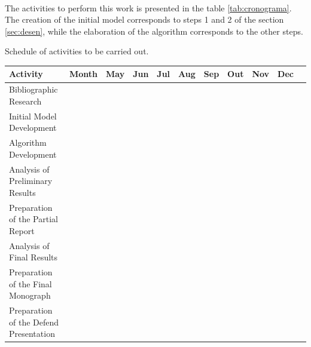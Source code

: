 \documentclass[11pt, a4paper]{article}
\begin{document}
    \paragraph{}
    The activities to perform this work is presented in the table \ref{tab:cronograma}. The creation of the initial model corresponds to steps 1 and 2 of the section \ref{sec:desen}, while the elaboration of the algorithm corresponds to the other steps.
    
    \begin{adjustwidth}{-2.5 cm}{-2.5 cm}\centering
    \begin{threeparttable}[!htb]
        \caption{Schedule of activities to be carried out.}\label{tab:cronograma}
        \scriptsize
        \begin{tabular}{|lr|r|r|r|r|r|r|r|r|r|}\hline%
            \textbf{Activity} &\textbf{Month} &May &Jun &Jul &Aug &Sep &Out &Nov &Dec \\\hline%
            Bibliographic Research & &\cellcolor[HTML]{6aa84f} &\cellcolor[HTML]{6aa84f} &\cellcolor[HTML]{6aa84f} &\cellcolor[HTML]{6aa84f} &\cellcolor[HTML]{6aa84f} &\cellcolor[HTML]{6aa84f} &\cellcolor[HTML]{6aa84f} & \\ \hline
            Initial Model Development & &\cellcolor[HTML]{6aa84f} &\cellcolor[HTML]{6aa84f} & & & & & & \\ \hline
            Algorithm Development & & &\cellcolor[HTML]{6aa84f} &\cellcolor[HTML]{6aa84f} &\cellcolor[HTML]{6aa84f} &\cellcolor[HTML]{6aa84f} &\cellcolor[HTML]{6aa84f} & & \\ \hline
            Analysis of Preliminary Results & & &\cellcolor[HTML]{6aa84f} &\cellcolor[HTML]{6aa84f} &\cellcolor[HTML]{6aa84f} &\cellcolor[HTML]{6aa84f} &\cellcolor[HTML]{6aa84f} & & \\ \hline
            Preparation of the Partial Report & & & &\cellcolor[HTML]{6aa84f} &\cellcolor[HTML]{6aa84f} & & & & \\ \hline
            Analysis of Final Results & & & & & & & &\cellcolor[HTML]{6aa84f} & \\ \hline
            Preparation of the Final Monograph & & & & & & &\cellcolor[HTML]{6aa84f} &\cellcolor[HTML]{6aa84f} & \\ \hline
            Preparation of the Defend Presentation & & & & & & & & &\cellcolor[HTML]{6aa84f} \\ 
            \hline%
        \end{tabular}
        \end{threeparttable}
    \end{adjustwidth}
    
\end{document}
